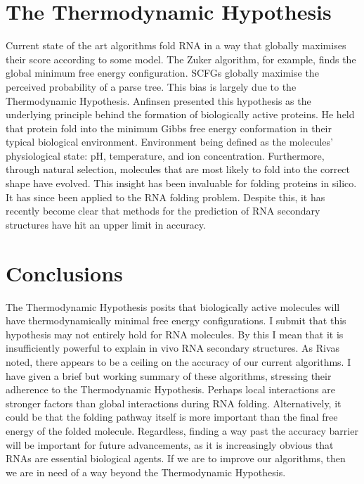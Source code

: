 \documentclass[12pt, a4paper]{article}
\begin{document}
\section{The Thermodynamic Hypothesis}
Current state of the art algorithms fold RNA in a way that globally maximises their score according to some model. The Zuker algorithm, for example, finds the global minimum free energy configuration. SCFGs globally maximise the perceived probability of a parse tree. This bias is largely due to the Thermodynamic Hypothesis. Anfinsen \cite{anfinsen1973principles} presented this hypothesis as the underlying principle behind the formation of biologically active proteins. He held that protein fold into the minimum Gibbs free energy conformation in their typical biological environment. Environment being defined as the molecules' physiological state: pH, temperature, and ion concentration. Furthermore, through natural selection, molecules that are most likely to fold into the correct shape have evolved. This insight has been invaluable for folding proteins in silico. It has since been applied to the RNA folding problem. Despite this, it has recently become clear that methods for the prediction of RNA secondary structures have hit an upper limit in accuracy.


\section{Conclusions}

The Thermodynamic Hypothesis posits that biologically active molecules will have thermodynamically minimal free energy configurations. I submit that this hypothesis may not entirely hold for RNA molecules. By this I mean that it is insufficiently powerful to explain in vivo RNA secondary structures. As Rivas \cite{rivas2013four} noted, there appears to be a ceiling on the accuracy of our current algorithms. I have given a brief but working summary of these algorithms, stressing their adherence to the Thermodynamic Hypothesis. Perhaps local interactions are stronger factors than global interactions during RNA folding. Alternatively, it could be that the folding pathway itself is more important than the final free energy of the folded molecule. Regardless, finding a way past the accuracy barrier will be important for future advancements, as it is increasingly obvious that RNAs are essential biological agents. If we are to improve our algorithms, then we are in need of a way beyond the Thermodynamic Hypothesis.







\end{document}
